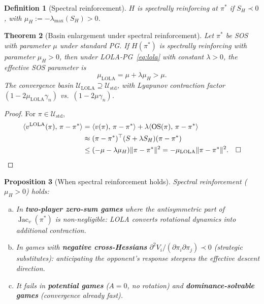 \documentclass[10pt,letterpaper]{article}
\newtheorem{theorem}{Theorem}
\newtheorem{proposition}[theorem]{Proposition}
\newtheorem{definition}[theorem]{Definition}
\newcommand{\calU}{\mathcal{U}}
\newcommand{\ip}[2]{\langle #1,\, #2 \rangle}
\newcommand{\norm}[1]{\| #1 \|}
\DeclareMathOperator{\Jac}{Jac}
\begin{document}
\begin{definition}[Spectral reinforcement]
\label{def:spectral}
$H$ is \emph{spectrally reinforcing} at $\pi^*$ if
$S_H \prec 0$, with $\mu_H := -\lambda_{\max}(S_H) > 0$.
\end{definition}

\begin{theorem}[Basin enlargement under spectral reinforcement]
\label{thm:basin}
Let $\pi^*$ be SOS with parameter $\mu$ under standard PG. If
$H(\pi^*)$ is spectrally reinforcing with parameter $\mu_H > 0$,
then under LOLA-PG~\eqref{eq:lola} with constant $\lambda > 0$,
the effective SOS parameter is
\begin{equation}
  \label{eq:mu-lola}
  \mu_{\mathrm{LOLA}} = \mu + \lambda \mu_H > \mu.
\end{equation}
The convergence basin $\calU_{\mathrm{LOLA}} \supseteq \calU_{\mathrm{std}}$,
with Lyapunov contraction factor $(1 - 2\mu_{\mathrm{LOLA}}\gamma_n)$
vs.\ $(1 - 2\mu\gamma_n)$.
\end{theorem}

\begin{proof}
For $\pi \in \calU_{\mathrm{std}}$,
\begin{align}
  \ip{v^{\mathrm{LOLA}}(\pi)}{\pi - \pi^*}
  &= \ip{v(\pi)}{\pi - \pi^*} + \lambda\ip{\mathrm{OS}(\pi)}{\pi - \pi^*} \notag\\
  &\approx (\pi-\pi^*)^\top (S + \lambda S_H)(\pi-\pi^*) \notag\\
  &\leq (-\mu - \lambda\mu_H)\norm{\pi - \pi^*}^2 = -\mu_{\mathrm{LOLA}}\norm{\pi - \pi^*}^2.\quad\square \notag
\end{align}
\end{proof}

\begin{proposition}[When spectral reinforcement holds]
\label{prop:when}
Spectral reinforcement ($\mu_H > 0$) holds:
\begin{enumerate}[(a)]
\item In \textbf{two-player zero-sum games} where the antisymmetric
  part of $\Jac_v(\pi^*)$ is non-negligible: LOLA converts rotational
  dynamics into additional contraction.
\item In games with \textbf{negative cross-Hessians}
  $\partial^2 V_i/(\partial\pi_i\partial\pi_j) \prec 0$ (strategic
  substitutes): anticipating the opponent's response steepens the
  effective descent direction.
\item It fails in \textbf{potential games} ($A = 0$, no rotation)
  and \textbf{dominance-solvable games} (convergence already fast).
\end{enumerate}
\end{proposition}
\end{document}
